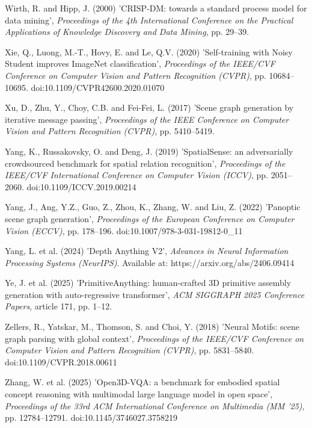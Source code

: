 \begin{description}[leftmargin=2em, labelindent=0em, itemsep=0.1em, parsep=0pt, topsep=0.3em]
\item[] Wirth, R. and Hipp, J. (2000) 'CRISP-DM: towards a standard process model for data mining', \textit{Proceedings of the 4th International Conference on the Practical Applications of Knowledge Discovery and Data Mining}, pp. 29--39.
\item[] Xie, Q., Luong, M.-T., Hovy, E. and Le, Q.V. (2020) 'Self-training with Noisy Student improves ImageNet classification', \textit{Proceedings of the IEEE/CVF Conference on Computer Vision and Pattern Recognition (CVPR)}, pp. 10684--10695. doi:10.1109/CVPR42600.2020.01070
\item[] Xu, D., Zhu, Y., Choy, C.B. and Fei-Fei, L. (2017) 'Scene graph generation by iterative message passing', \textit{Proceedings of the IEEE Conference on Computer Vision and Pattern Recognition (CVPR)}, pp. 5410--5419.
\item[] Yang, K., Russakovsky, O. and Deng, J. (2019) 'SpatialSense: an adversarially crowdsourced benchmark for spatial relation recognition', \textit{Proceedings of the IEEE/CVF International Conference on Computer Vision (ICCV)}, pp. 2051--2060. doi:10.1109/ICCV.2019.00214
\item[] Yang, J., Ang, Y.Z., Guo, Z., Zhou, K., Zhang, W. and Liu, Z. (2022) 'Panoptic scene graph generation', \textit{Proceedings of the European Conference on Computer Vision (ECCV)}, pp. 178--196. doi:10.1007/978-3-031-19812-0\_\allowbreak{}11
\item[] Yang, L. et al. (2024) 'Depth Anything V2', \textit{Advances in Neural Information Processing Systems (NeurIPS)}. Available at: https:/\allowbreak{}/\allowbreak{}arxiv.\allowbreak{}org/\allowbreak{}abs/\allowbreak{}2406.\allowbreak{}09414
\item[] Ye, J. et al. (2025) 'PrimitiveAnything: human-crafted 3D primitive assembly generation with auto-regressive transformer', \textit{ACM SIGGRAPH 2025 Conference Papers}, article 171, pp. 1--12.
\item[] Zellers, R., Yatskar, M., Thomson, S. and Choi, Y. (2018) 'Neural Motifs: scene graph parsing with global context', \textit{Proceedings of the IEEE/CVF Conference on Computer Vision and Pattern Recognition (CVPR)}, pp. 5831--5840. doi:10.1109/CVPR.2018.00611
\item[] Zhang, W. et al. (2025) 'Open3D-VQA: a benchmark for embodied spatial concept reasoning with multimodal large language model in open space', \textit{Proceedings of the 33rd ACM International Conference on Multimedia (MM '25)}, pp. 12784--12791. doi:10.1145/3746027.3758219
\end{description}
\normalsize